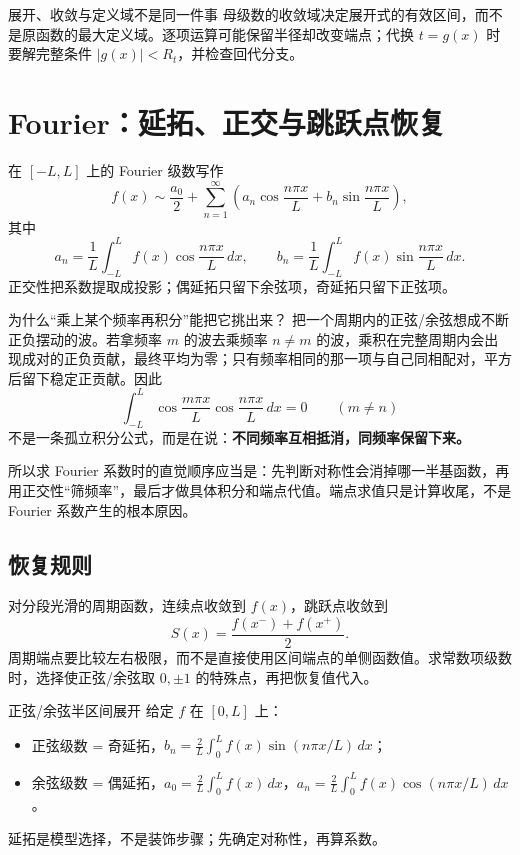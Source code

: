 \documentclass[11pt,a4paper,fontset=fandol]{ctexart}
\begin{document}
\begin{warnbox}{展开、收敛与定义域不是同一件事}
母级数的收敛域决定展开式的有效区间，而不是原函数的最大定义域。逐项运算可能保留半径却改变端点；代换 $t=g(x)$ 时要解完整条件 $\lvert g(x)\rvert<R_t$，并检查回代分支。
\end{warnbox}

\section{Fourier：延拓、正交与跳跃点恢复}
在 $[-L,L]$ 上的 Fourier 级数写作
\[
f(x)\sim \frac{a_0}{2}+\sum_{n=1}^{\infty}\left(a_n\cos\frac{n\pi x}{L}+b_n\sin\frac{n\pi x}{L}\right),
\]
其中
\[
a_n=\frac1L\int_{-L}^{L}f(x)\cos\frac{n\pi x}{L}\,dx,\qquad
b_n=\frac1L\int_{-L}^{L}f(x)\sin\frac{n\pi x}{L}\,dx.
\]
正交性把系数提取成投影；偶延拓只留下余弦项，奇延拓只留下正弦项。

\begin{corebox}{为什么“乘上某个频率再积分”能把它挑出来？}
把一个周期内的正弦/余弦想成不断正负摆动的波。若拿频率 $m$ 的波去乘频率 $n\ne m$ 的波，乘积在完整周期内会出现成对的正负贡献，最终平均为零；只有频率相同的那一项与自己同相配对，平方后留下稳定正贡献。因此
\[
\int_{-L}^{L}\cos\frac{m\pi x}{L}\cos\frac{n\pi x}{L}\,dx=0\qquad(m\ne n)
\]
不是一条孤立积分公式，而是在说：\textbf{不同频率互相抵消，同频率保留下来。}

所以求 Fourier 系数时的直觉顺序应当是：先判断对称性会消掉哪一半基函数，再用正交性“筛频率”，最后才做具体积分和端点代值。端点求值只是计算收尾，不是 Fourier 系数产生的根本原因。
\end{corebox}

\subsection{恢复规则}
对分段光滑的周期函数，连续点收敛到 $f(x)$，跳跃点收敛到
\[
S(x)=\frac{f(x^-)+f(x^+)}2.
\]
周期端点要比较左右极限，而不是直接使用区间端点的单侧函数值。求常数项级数时，选择使正弦/余弦取 $0,\pm1$ 的特殊点，再把恢复值代入。

\begin{methodbox}{正弦/余弦半区间展开}
给定 $f$ 在 $[0,L]$ 上：
\begin{itemize}
  \item 正弦级数 = 奇延拓，$b_n=\frac2L\int_0^L f(x)\sin(n\pi x/L)\,dx$；
  \item 余弦级数 = 偶延拓，$a_0=\frac2L\int_0^L f(x)\,dx$，$a_n=\frac2L\int_0^L f(x)\cos(n\pi x/L)\,dx$。
\end{itemize}
延拓是模型选择，不是装饰步骤；先确定对称性，再算系数。
\end{methodbox}
\end{document}

